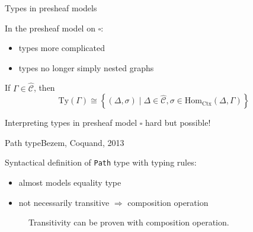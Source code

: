 \documentclass[english,draft]{beamer}
\newcommand{\pa}[3]{\texttt{Path}_{#1}\left(#2, #3\right)}
\begin{document}
\begin{frame}{Types in presheaf models}

In the presheaf model on $\square$:
\begin{itemize}
    \item types more complicated
    \item types no longer simply nested graphs
\end{itemize}


\begin{lemma}

If $\Gamma \in \widehat{\mathcal{C}}$, then 
$$\text{Ty}(\Gamma) \cong \left\{ (\Delta, \sigma) \mid \Delta \in \widehat{\mathcal{C}}, \sigma \in \text{Hom}_{\text{Ctx}}(\Delta , \Gamma) \right\}$$
\end{lemma}

\pause


Interpreting types in presheaf model $\square$ hard but possible! 



\end{frame}

\begin{frame}{Path type}{Bezem, Coquand, 2013}
 
 Syntactical definition of \texttt{Path} type with typing rules:

\begin{prooftree}

\end{prooftree}

% 

\begin{itemize}
 \item almost models equality type
 \item not necessarily transitive $\Rightarrow$ composition operation
\end{itemize}


\begin{figure}
\centering

\caption{Transitivity can be proven with composition operation.}
\end{figure}

\end{frame}
\end{document}
